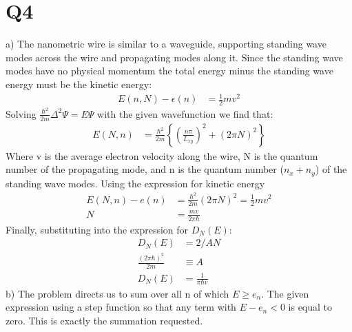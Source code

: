 \documentclass[a4paper,11pt]{article}
\numberwithin{equation}{section}
\newcommand{\lrp}[1]{\left({#1}\right)}
\newcommand{\lrb}[1]{\left\{{#1}\right\}}
\begin{document}
\section*{Q4}
a) The nanometric wire is similar to a waveguide, supporting standing wave modes across the wire and propagating modes along it.
Since the standing wave modes have no physical momentum the total energy minus the standing wave energy must be the kinetic energy:
\begin{align}
 E(n,N) - \epsilon(n) &= \frac{1}{2} mv^2
\end{align}
Solving $\frac{\hbar^2}{2m}\Delta^2 \Psi = E\Psi$ with the given wavefunction we find that:
\begin{align}
 E(N,n) &= \frac{\hbar^2}{2m}\lrb{\lrp{\frac{n\pi}{L_{xy}}}^2+(2\pi N)^2}
\end{align}
Where v is the average electron velocity along the wire, N is the quantum number of the propagating mode, and n is the quantum number ($n_x+n_y$) of the standing wave modes.
Using the expression for kinetic energy
\begin{align}
 E(N,n) - e(n) &= \frac{\hbar^2}{2m}\lrp{2\pi N}^2 = \frac{1}{2}mv^2\\
 N &= \frac{mv}{2\pi\hbar}
\end{align}
Finally, substituting into the expression for $D_N(E)$:
\begin{align}
 D_N(E) &= 2/AN\\
 \frac{\lrp{2\pi\hbar}^2}{2m} &\equiv A\\
 D_N(E) &= \frac{1}{\pi \hbar v}
\end{align}
b) The problem directs us to sum over all n of which $E\ge e_n$. 
The given expression using a step function so that any term with $E-e_n < 0$ is equal to zero.
This is exactly the summation requested.
\end{document}
